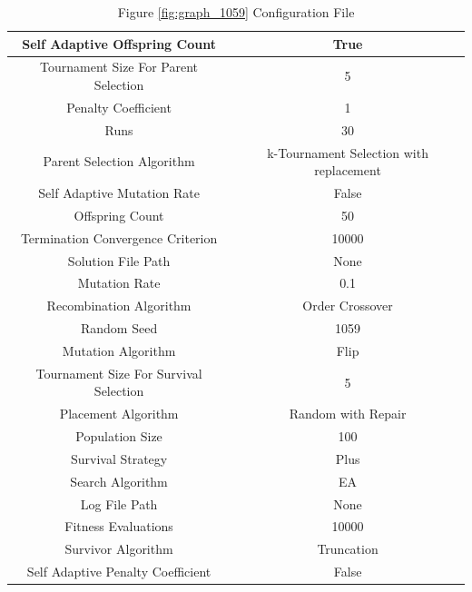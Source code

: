 \documentclass{standalone}
\begin{document}
\begin{table}[!htb]
	\centering
	\caption{Figure \ref{fig:graph_1059} Configuration File}
	\label{tab:graph_1059}
	\begin{tabular}{| c | c |}
		\hline
		Self Adaptive Offspring Count		& True		 \\
		\hline
		Tournament Size For Parent Selection		& 5		 \\
		\hline
		Penalty Coefficient		& 1		 \\
		\hline
		Runs		& 30		 \\
		\hline
		Parent Selection Algorithm		& k-Tournament Selection with replacement		 \\
		\hline
		Self Adaptive Mutation Rate		& False		 \\
		\hline
		Offspring Count		& 50		 \\
		\hline
		Termination Convergence Criterion		& 10000		 \\
		\hline
		Solution File Path		& None		 \\
		\hline
		Mutation Rate		& 0.1		 \\
		\hline
		Recombination Algorithm		& Order Crossover		 \\
		\hline
		Random Seed		& 1059		 \\
		\hline
		Mutation Algorithm		& Flip		 \\
		\hline
		Tournament Size For Survival Selection		& 5		 \\
		\hline
		Placement Algorithm		& Random with Repair		 \\
		\hline
		Population Size		& 100		 \\
		\hline
		Survival Strategy		& Plus		 \\
		\hline
		Search Algorithm		& EA		 \\
		\hline
		Log File Path		& None		 \\
		\hline
		Fitness Evaluations		& 10000		 \\
		\hline
		Survivor Algorithm		& Truncation		 \\
		\hline
		Self Adaptive Penalty Coefficient		& False		 \\
		\hline
	\end{tabular}
\end{table}
\end{document}

